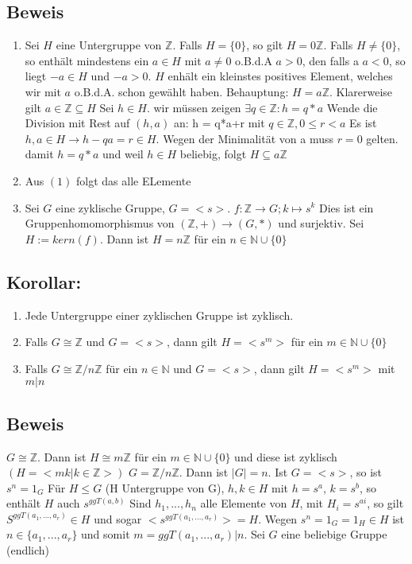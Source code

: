 \documentclass[12pt,a4paper,ngerman]{scrreprt}
\begin{document}
\subsection{Beweis}
\begin{enumerate}[(1)]
\item Sei $H$ eine Untergruppe von $\mathbb{Z}$.
Falls $H = \{0\}$, so gilt $H = 0\mathbb{Z}$.
Falls $H \neq \{0\}$, so enthält %
mindestens ein $a \in H$ mit $a \neq 0$ o.B.d.A $a > 0$, den falls a $a < 0$,
so liegt $-a \in H$ und $-a > 0$. 
$H$ enhält ein kleinstes positives Element, welches wir mit $a$ o.B.d.A. schon gewählt haben.
Behauptung: $H = a\mathbb{Z}$. Klarerweise gilt $a \in \mathbb{Z} \subseteq H$
Sei $h \in H$. wir müssen zeigen $\exists q \in \mathbb{Z}: h = q*a$
Wende die Division mit Rest auf $(h,a)$ an: h = q*a+r mit $q \in \mathbb{Z}, 0\leq r < a$
Es ist $h,a \in H \to h-qa = r \in H.$
Wegen der Minimalität von a muss $r = 0$ gelten.
damit $h = q*a$ und weil $h \in H$ beliebig, folgt $H \subseteq a\mathbb{Z}$
\item Aus $(1)$ folgt das alle ELemente %
\item Sei $G$ eine zyklische Gruppe, $G = <s>$. 
$f: \mathbb{Z} \to G ; k \mapsto s^k$ 
Dies ist ein Gruppenhomomorphismus von $(\mathbb{Z},+) \to (G,*)$ und surjektiv.
Sei $H := kern(f)$. Dann ist $H = n\mathbb{Z}$ für ein $n \in \mathbb{N} \cup \{0\}$
\end{enumerate}

\subsection{Korollar:}
\begin{enumerate}[1)]
\item Jede Untergruppe einer zyklischen Gruppe ist zyklisch.
\item Falls $G \cong \mathbb{Z}$ und $G = <s>$, 
dann gilt $H = <s^m>$ für ein $m \in \mathbb{N} \cup \{0\}$
\item Falls $G \cong \mathbb{Z}/n\mathbb{Z}$ für ein $n \in \mathbb{N}$ und $G = <s>$,
dann gilt $H = <s^m>$ mit $m|n$
\end{enumerate}
\subsection{Beweis}
$G \cong \mathbb{Z}$. Dann ist $H \cong m\mathbb{Z}$ für ein $m \in \mathbb{N} \cup \{0\}$
und diese ist zyklisch $(H=<mk|k\in\mathbb{Z}>)$
$G = \mathbb{Z}/n\mathbb{Z}$. Dann ist $|G|=n$. Ist $G=<s>$, so ist $s^n = 1_G$
Für $H \leq G$ (H Untergruppe von G), $h,k \in H$ mit $h=s^a$, $k = s^b$,
so enthält $H$ auch $s^{ggT(a,b)}$
Sind $h_1, ..., h_n$ alle Elemente von $H$, mit $H_i = s^{ai}$, 
so gilt $S^{ggT(a_1,...,a_r)} \in H$ und sogar $<s^{ggT(a_1,...,a_r)}> = H$. 
Wegen $s^n = 1_G = 1_H \in H$ ist $n \in \{a_1, ... , a_r\}$ 
und somit $ m = ggT(a_1, ... , a_r) | n$.
Sei $G$ eine beliebige Gruppe (endlich)
\end{document}
